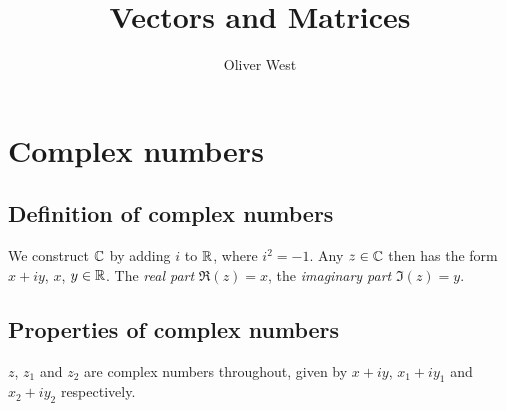 \documentclass{../../template/note}
\author{Oliver West}
\title{Vectors and Matrices}
\date{}
\begin{document}
    
    \maketitle

    \tableofcontents

    
    \section{Complex numbers}

    \subsection{Definition of complex numbers}

    We construct \(\mathbb C\) by adding \(i\) to \(\mathbb R\), where \(i^2=-1\). Any \(z \in \mathbb C\) then has the form \(x + iy\), \(x\), \(y \in \mathbb R\). The \emph{real part} \(\Re(z) = x\), the \emph{imaginary part} \(\Im(z) = y\).

    \subsection{Properties of complex numbers}

    \(z\), \(z_1\) and \(z_2\) are complex numbers throughout, given by \(x+iy\), \(x_1+iy_1\) and \(x_2+iy_2\) respectively.
\end{document}
